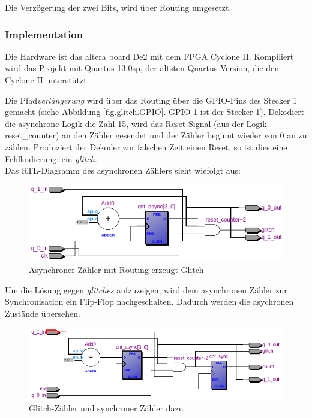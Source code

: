 Die Verzögerung der zwei Bits, wird über Routing umgesetzt. 



\subsubsection{Implementation} 
Die Hardware ist das altera board De2 mit dem FPGA Cyclone II. Kompiliert wird das Projekt mit Quartus 13.0sp, der ältsten Quartus-Version, die den Cyclone II unterstützt.

Die Pfad\textit{verlängerung} wird über das Routing über die GPIO-Pins des Stecker 1 gemacht (siehe Abbildung \ref{fig.glitch.GPIO}. GPIO 1 ist der Stecker 1). Dekodiert die asynchrone Logik die Zahl 15, wird das  Reset-Signal (aus der Logik reset\_counter) an den Zähler gesendet und der Zähler beginnt wieder von 0 an zu zählen. Produziert der Dekoder zur falschen Zeit einen Reset, so ist dies eine Fehlkodierung: ein \textit{glitch}.\\

Das RTL-Diagramm des asynchronen Zählers sieht wiefolgt aus:
\begin{figure}[H]
	\includegraphics[width=1\textwidth]{images/glitch/RTL_asynchron.png}
	\caption{Asynchroner Zähler mit Routing erzeugt Glitch}
	\label{fig.glitch.RTL_nurGlitch}
\end{figure}

Um die Lösung gegen \textit{glitches} aufzuzeigen, wird dem asynchronen Zähler zur Synchronisation ein Flip-Flop nachgeschalten. Dadurch werden die asychronen Zustände übersehen. 
\begin{figure}[H]
	\includegraphics[width=\textwidth]{images/glitch/glitch_asynch_new.png}
	\caption{Glitch-Zähler und synchroner Zähler dazu}
	\label{fig.glitch.RTL_mit_synchr.Zaehler}
\end{figure}

